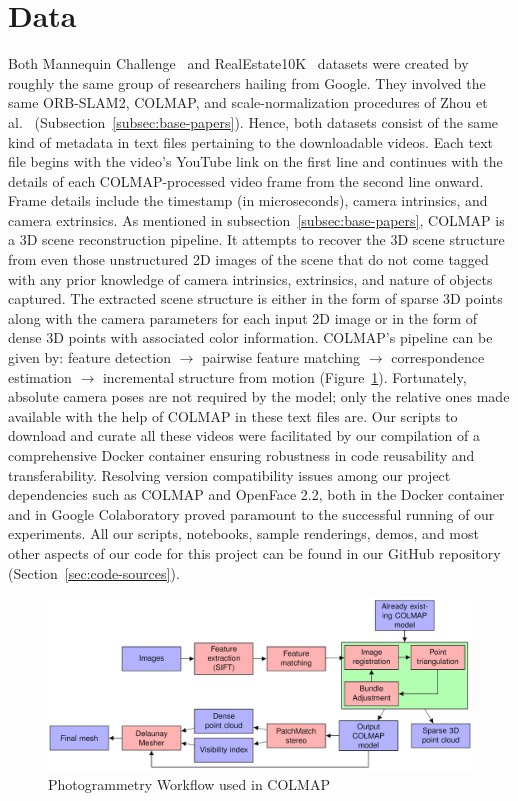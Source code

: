 \section{Data}\label{sec:data} 

Both Mannequin Challenge~\cite{li2019learning} and RealEstate10K~\cite{zhou2018stereo} datasets were created by roughly the same group of researchers hailing from Google. They involved the same ORB-SLAM2, COLMAP, and scale-normalization procedures of Zhou et al.~\cite{zhou2018stereo} (Subsection~\ref{subsec:base-papers}). Hence, both datasets consist of the same kind of metadata in text files pertaining to the downloadable videos. Each text file begins with the video’s YouTube link on the first line and continues with the details of each COLMAP-processed video frame from the second line onward. Frame details include the timestamp (in microseconds), camera intrinsics, and camera extrinsics. As mentioned in subsection~\ref{subsec:base-papers}, COLMAP is a 3D scene reconstruction pipeline. It attempts to recover the 3D scene structure from even those unstructured 2D images of the scene that do not come tagged with any prior knowledge of camera intrinsics, extrinsics, and nature of objects captured. The extracted scene structure is either in the form of sparse 3D points along with the camera parameters for each input 2D image or in the form of dense 3D points with associated color information. COLMAP's pipeline can be given by: feature detection $\rightarrow$ pairwise feature matching  $\rightarrow$ correspondence estimation $\rightarrow$ incremental structure from motion (Figure~\ref{fig:colmap-photogrammetry-pipeline}). Fortunately, absolute camera poses are not required by the model; only the relative ones made available with the help of COLMAP in these text files are. Our scripts to download and curate all these videos were facilitated by our compilation of a comprehensive Docker container ensuring robustness in code reusability and transferability. Resolving version compatibility issues among our project dependencies such as COLMAP and OpenFace 2.2, both in the Docker container and in Google Colaboratory proved paramount to the successful running of our experiments. All our scripts, notebooks, sample renderings, demos, and most other aspects of our code for this project can be found in our GitHub repository (Section~\ref{sec:code-sources}).

\begin{figure}[!h]
    \includegraphics[width=1\columnwidth]{figures/colmap-photogrammetry-pipeline.png}
    \caption{Photogrammetry Workflow used in COLMAP~\cite{pinard_does_2021}}
    \label{fig:colmap-photogrammetry-pipeline}
\end{figure}
    
